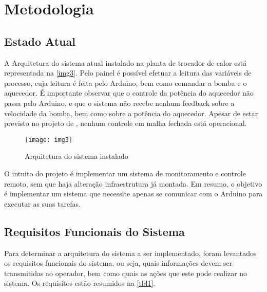 \chapter{Metodologia}
	
	\section{Estado Atual}
	
		A Arquitetura do sistema atual instalado na planta de trocador de calor está representada na \autoref{img3}. Pelo painel é possível efetuar a leitura das variáveis de processo, cuja leitura é feita pelo Arduino, bem como comandar a bomba e o aquecedor. É importante observar que o controle da potência do aquecedor não passa pelo Arduino, e que o sistema não recebe nenhum feedback sobre a velocidade da bomba, bem como sobre a potência do aquecedor. Apesar de estar previsto no projeto de \textcite{luiz2016}, nenhum controle em malha fechada está operacional.
		
		\begin{figure}[!htb]	
			\captionsetup{justification=centering}
			\begin{center}
				\texttt{[image: img3]}  %
				\caption[Arquitetura do sistema instalado]{\label{img3}Arquitetura do sistema instalado}
			\end{center}		
		\end{figure}
	
		O intuito do projeto é implementar um sistema de monitoramento e controle remoto, sem que haja alteração infraestrutura já montada. Em resumo, o objetivo é implementar um sistema que necessite apenas se comunicar com o Arduino para executar as suas tarefas.
	
	
	\section{Requisitos Funcionais do Sistema}
		Para determinar a arquitetura do sistema a ser implementado, foram levantados os requisitos funcionais do sistema, ou seja, quais informações devem ser transmitidas ao operador, bem como quais as ações que este pode realizar no sistema. Os requisitos estão resumidos na \autoref{tbl1}.
		
